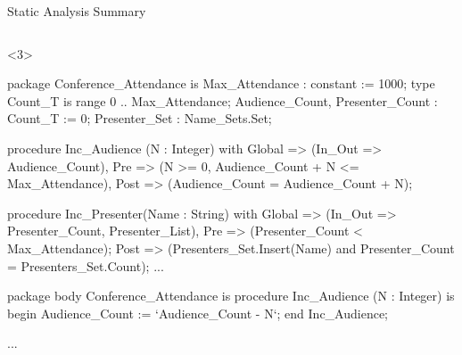 \documentclass{beamer}
\begin{document}
\begin{frame}[fragile]{Static Analysis Summary}
\begin{columns}
\begin{column}{9cm}
      \begin{onlyenv}<3>
      \begin{pxcode}[language=SPARK,style=magic,gobble=8]
        package Conference_Attendance
        is
           Max_Attendance : constant := 1000;
           type Count_T is range 0 .. Max_Attendance;
           Audience_Count, Presenter_Count : Count_T := 0;
           Presenter_Set : Name_Sets.Set;

           procedure Inc_Audience (N : Integer)
           with Global => (In_Out => Audience_Count),
                Pre    => (N >= 0, Audience_Count + N <= Max_Attendance),
                Post   => (Audience_Count = Audience_Count + N);

           procedure Inc_Presenter(Name : String)
           with Global => (In_Out => Presenter_Count, Presenter_List),
                Pre    => (Presenter_Count < Max_Attendance);
                Post   => (Presenters_Set.Insert(Name) and 
                           Presenter_Count = Presenters_Set.Count);
           ...


        package body Conference_Attendance
        is
           procedure Inc_Audience (N : Integer)
           is
           begin
              Audience_Count := `Audience_Count - N`;
           end Inc_Audience;

           ...
      \end{pxcode}
      \end{onlyenv}

    \end{column}
  \end{columns}

\end{frame}
\end{document}
